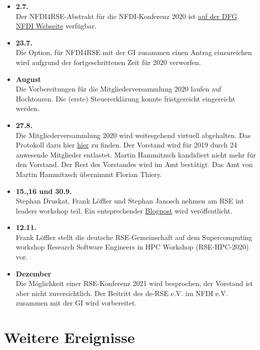 \begin{itemize}
 \item \textbf{2.7.}\\Der NFDI4RSE-Abstrakt für die NFDI-Konferenz 2020 ist \href{https://www.dfg.de/download/pdf/foerderung/programme/nfdi/nfdi_konferenz_2020/nfdi4rse_abstract.pdf}{auf der DFG NFDI Webseite} verfügbar.
 \item \textbf{23.7.}\\Die Option, für NFDI4RSE mit der GI zusammen einen Antrag einzureichen wird aufgrund der fortgeschrittenen Zeit für 2020 verworfen.
 \item \textbf{August}\\Die Vorbereitungen für die Mitgliederversammlung 2020 laufen auf Hochtouren. Die (erste) Steuererklärung konnte fristgereicht eingereicht werden.
 \item \textbf{27.8.}\\Die Mitgliederversammlung 2020 wird weitesgehend virtuell abgehalten. Das Protokoll dazu hier \href{https://github.com/DE-RSE/protokolle/blob/master/Mitgliederversammlungen/MV-deRSE-2020-08-27-V1.md}{hier} zu finden. Der Vorstand wird für 2019 durch 24 anwesende Mitglieder entlastet. Martin Hammitzsch kandidiert nicht mehr für den Vorstand. Der Rest des Vorstandes wird im Amt bestätigt. Das Amt von Martin Hammitzsch übernimmt Florian Thiery.
 \item \textbf{15.,16 und 30.9.}\\Stephan Druskat, Frank Löffler und Stephan Janosch nehmen am RSE int leaders workshop teil. Ein entsprechender \href{https://researchsoftware.org/2020/10/09/2nd-international-rse-leaders-workshop.html}{Blogpost} wird veröffentlicht.
 \item \textbf{12.11.}\\Frank Löffler stellt die deutsche RSE-Gemeinschaft auf dem Supercomputing workshop Research Software Engineers in HPC Workshop (RSE-HPC-2020) vor.
 \item \textbf{Dezember}\\Die Möglichkeit einer RSE-Konferenz 2021 wird besprochen, der Vorstand ist aber nicht zuversichtlich. Der Beitritt des de-RSE e.V. im NFDI e.V. zusammen mit der GI wird vorbereitet.
\end{itemize}

\section{Weitere Ereignisse}


